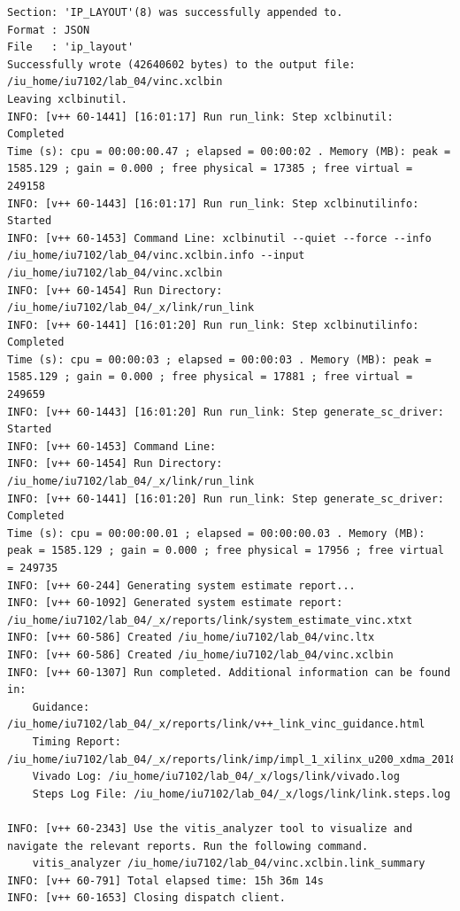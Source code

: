 \begin{lstlisting}[label=code, basicstyle=\tiny, caption=Листинг файла v++\_vinc.log]
Section: 'IP_LAYOUT'(8) was successfully appended to.
Format : JSON
File   : 'ip_layout'
Successfully wrote (42640602 bytes) to the output file: /iu_home/iu7102/lab_04/vinc.xclbin
Leaving xclbinutil.
INFO: [v++ 60-1441] [16:01:17] Run run_link: Step xclbinutil: Completed
Time (s): cpu = 00:00:00.47 ; elapsed = 00:00:02 . Memory (MB): peak = 1585.129 ; gain = 0.000 ; free physical = 17385 ; free virtual = 249158
INFO: [v++ 60-1443] [16:01:17] Run run_link: Step xclbinutilinfo: Started
INFO: [v++ 60-1453] Command Line: xclbinutil --quiet --force --info /iu_home/iu7102/lab_04/vinc.xclbin.info --input /iu_home/iu7102/lab_04/vinc.xclbin
INFO: [v++ 60-1454] Run Directory: /iu_home/iu7102/lab_04/_x/link/run_link
INFO: [v++ 60-1441] [16:01:20] Run run_link: Step xclbinutilinfo: Completed
Time (s): cpu = 00:00:03 ; elapsed = 00:00:03 . Memory (MB): peak = 1585.129 ; gain = 0.000 ; free physical = 17881 ; free virtual = 249659
INFO: [v++ 60-1443] [16:01:20] Run run_link: Step generate_sc_driver: Started
INFO: [v++ 60-1453] Command Line: 
INFO: [v++ 60-1454] Run Directory: /iu_home/iu7102/lab_04/_x/link/run_link
INFO: [v++ 60-1441] [16:01:20] Run run_link: Step generate_sc_driver: Completed
Time (s): cpu = 00:00:00.01 ; elapsed = 00:00:00.03 . Memory (MB): peak = 1585.129 ; gain = 0.000 ; free physical = 17956 ; free virtual = 249735
INFO: [v++ 60-244] Generating system estimate report...
INFO: [v++ 60-1092] Generated system estimate report: /iu_home/iu7102/lab_04/_x/reports/link/system_estimate_vinc.xtxt
INFO: [v++ 60-586] Created /iu_home/iu7102/lab_04/vinc.ltx
INFO: [v++ 60-586] Created /iu_home/iu7102/lab_04/vinc.xclbin
INFO: [v++ 60-1307] Run completed. Additional information can be found in:
	Guidance: /iu_home/iu7102/lab_04/_x/reports/link/v++_link_vinc_guidance.html
	Timing Report: /iu_home/iu7102/lab_04/_x/reports/link/imp/impl_1_xilinx_u200_xdma_201830_2_bb_locked_timing_summary_routed.rpt
	Vivado Log: /iu_home/iu7102/lab_04/_x/logs/link/vivado.log
	Steps Log File: /iu_home/iu7102/lab_04/_x/logs/link/link.steps.log

INFO: [v++ 60-2343] Use the vitis_analyzer tool to visualize and navigate the relevant reports. Run the following command. 
    vitis_analyzer /iu_home/iu7102/lab_04/vinc.xclbin.link_summary 
INFO: [v++ 60-791] Total elapsed time: 15h 36m 14s
INFO: [v++ 60-1653] Closing dispatch client.
\end{lstlisting}

